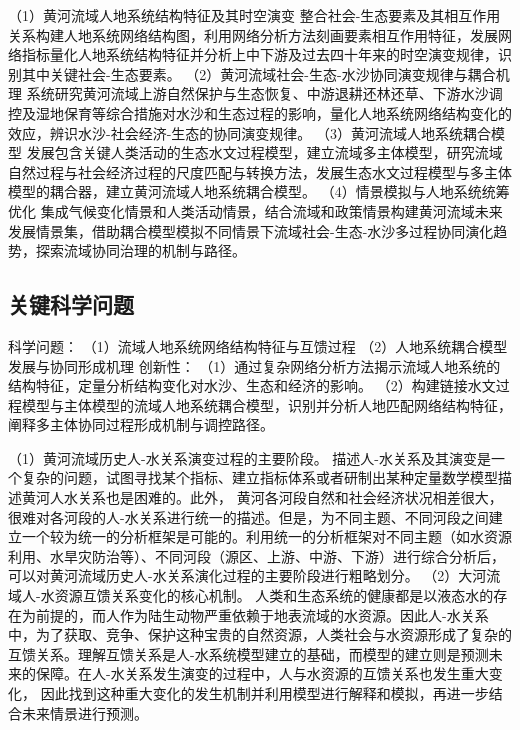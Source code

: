 （1）黄河流域人地系统结构特征及其时空演变
整合社会-生态要素及其相互作用关系构建人地系统网络结构图，利用网络分析方法刻画要素相互作用特征，发展网络指标量化人地系统结构特征并分析上中下游及过去四十年来的时空演变规律，识别其中关键社会-生态要素。
（2）黄河流域社会-生态-水沙协同演变规律与耦合机理
系统研究黄河流域上游自然保护与生态恢复、中游退耕还林还草、下游水沙调控及湿地保育等综合措施对水沙和生态过程的影响，量化人地系统网络结构变化的效应，辨识水沙-社会经济-生态的协同演变规律。
（3）黄河流域人地系统耦合模型
发展包含关键人类活动的生态水文过程模型，建立流域多主体模型，研究流域自然过程与社会经济过程的尺度匹配与转换方法，发展生态水文过程模型与多主体模型的耦合器，建立黄河流域人地系统耦合模型。
（4）情景模拟与人地系统统筹优化
集成气候变化情景和人类活动情景，结合流域和政策情景构建黄河流域未来发展情景集，借助耦合模型模拟不同情景下流域社会-生态-水沙多过程协同演化趋势，探索流域协同治理的机制与路径。

\subsection{关键科学问题}

科学问题：
（1）流域人地系统网络结构特征与互馈过程
（2）人地系统耦合模型发展与协同形成机理
创新性：
（1）通过复杂网络分析方法揭示流域人地系统的结构特征，定量分析结构变化对水沙、生态和经济的影响。
（2）构建链接水文过程模型与主体模型的流域人地系统耦合模型，识别并分析人地匹配网络结构特征，阐释多主体协同过程形成机制与调控路径。

（1）黄河流域历史人-水关系演变过程的主要阶段。
描述人-水关系及其演变是一个复杂的问题，试图寻找某个指标、建立指标体系或者研制出某种定量数学模型描述黄河人水关系也是困难的。此外， 黄河各河段自然和社会经济状况相差很大，很难对各河段的人-水关系进行统一的描述。但是，为不同主题、不同河段之间建立一个较为统一的分析框架是可能的。利用统一的分析框架对不同主题（如水资源利用、水旱灾防治等）、不同河段（源区、上游、中游、下游）进行综合分析后，可以对黄河流域历史人-水关系演化过程的主要阶段进行粗略划分。
（2）大河流域人-水资源互馈关系变化的核心机制。
人类和生态系统的健康都是以液态水的存在为前提的，而人作为陆生动物严重依赖于地表流域的水资源。因此人-水关系中，为了获取、竞争、保护这种宝贵的自然资源，人类社会与水资源形成了复杂的互馈关系。理解互馈关系是人-水系统模型建立的基础，而模型的建立则是预测未来的保障。在人-水关系发生演变的过程中，人与水资源的互馈关系也发生重大变化， 因此找到这种重大变化的发生机制并利用模型进行解释和模拟，再进一步结合未来情景进行预测。

